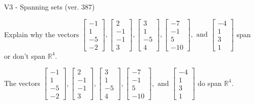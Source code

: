 \begin{exercise}
  \begin{exerciseTitle}V3 - Spanning sets (ver. 387)\end{exerciseTitle}
  \begin{exerciseStatement}
    Explain why the vectors \(\left[\begin{array}{r}
-1 \\
1 \\
-5 \\
-2
\end{array}\right] , \left[\begin{array}{r}
2 \\
-1 \\
-1 \\
3
\end{array}\right] , \left[\begin{array}{r}
3 \\
1 \\
-5 \\
4
\end{array}\right] , \left[\begin{array}{r}
-7 \\
-1 \\
5 \\
-10
\end{array}\right] , \text{ and } \left[\begin{array}{r}
-4 \\
1 \\
3 \\
1
\end{array}\right]\) span or don't span \(\mathbb{R}^4\). 
	


  \end{exerciseStatement}
  \begin{exerciseAnswer}
   The vectors \(\left[\begin{array}{r}
-1 \\
1 \\
-5 \\
-2
\end{array}\right] , \left[\begin{array}{r}
2 \\
-1 \\
-1 \\
3
\end{array}\right] , \left[\begin{array}{r}
3 \\
1 \\
-5 \\
4
\end{array}\right] , \left[\begin{array}{r}
-7 \\
-1 \\
5 \\
-10
\end{array}\right] , \text{ and } \left[\begin{array}{r}
-4 \\
1 \\
3 \\
1
\end{array}\right]\) 
  	 do  
	span \(\mathbb{R}^4\).
  



\end{exerciseAnswer}
\end{exercise}

